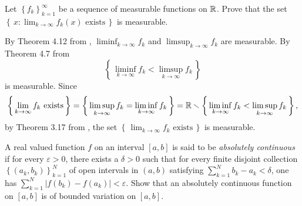 \begin{problem}
  Let $\left\{f_k\right\}_{k=1}^\infty$ be a sequence of measurable
  functions on $\mathbb{R}$. Prove that the set
  $\left\{\,x:\text{$\lim_{k\to\infty} f_k(x)$ exists}\,\right\}$ is
  measurable.
\end{problem}
\begin{solution}
  By Theorem 4.12 from \cite[Ch.\@ 4, p.\@ 67]{wheeden-zygmund},
  $\liminf_{k\to\infty}f_k$ and $\limsup_{k\to\infty}f_k$ are
  measurable. By Theorem 4.7 from \cite[Ch.\@ 4, p.\@ 66]{wheeden-zygmund}
  \begin{equation}
    \label{eq:prep:1:12}
    \left\{\,\liminf_{k\to\infty} f_k<\limsup_{k\to\infty} f_k\,\right\}
  \end{equation}
  is measurable. Since
  \begin{equation}
    \label{eq:prep:1:13}
    \left\{\,\text{$\lim_{k\to\infty}f_k$ exists}\,\right\}=
    \left\{\,{\limsup_{k\to\infty}f_k=\liminf_{k\to\infty}f_k}\,\right\}=
    \mathbb{R}\smallsetminus
    \left\{\,{\liminf_{k\to\infty} f_k<\limsup_{k\to\infty} f_k}\,\right\},
  \end{equation}
  by Theorem 3.17 from \cite[Ch.\@ 3, p.\@ 48]{wheeden-zygmund}, the set
  $\left\{\,\text{$\lim_{k\to\infty}f_k$ exists}\,\right\}$ is measurable.
\end{solution}
\begin{problem}
  A real valued function $f$ on an interval $[a,b]$ is said to be
  \emph{absolutely continuous} if for every $\varepsilon>0$, there exists a
  $\delta>0$ such that for every finite disjoint collection
  $\left\{(a_k,b_k)\right\}_{k=1}^N$ of open intervals in $(a,b)$
  satisfying $\sum_{k=1}^Nb_k-a_k<\delta$, one has
  $\sum_{k=1}^N\left|f(b_k)-f(a_k)\right|<\varepsilon$. Show that an
  absolutely continuous function on $[a,b]$ is of bounded variation on
  $[a,b]$.
\end{problem}
